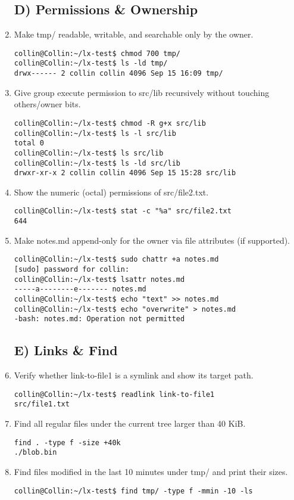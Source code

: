 \begin{enumerate}
\subsection*{D) Permissions \& Ownership}
    \item Make tmp/ readable, writable, and searchable only by the owner.
\begin{verbatim}
collin@Collin:~/lx-test$ chmod 700 tmp/
collin@Collin:~/lx-test$ ls -ld tmp/
drwx------ 2 collin collin 4096 Sep 15 16:09 tmp/
\end{verbatim}
    \item Give group execute permission to src/lib recursively without touching others/owner bits.
\begin{verbatim}
collin@Collin:~/lx-test$ chmod -R g+x src/lib
collin@Collin:~/lx-test$ ls -l src/lib
total 0
collin@Collin:~/lx-test$ ls src/lib
collin@Collin:~/lx-test$ ls -ld src/lib
drwxr-xr-x 2 collin collin 4096 Sep 15 15:28 src/lib
\end{verbatim}
    \item Show the numeric (octal) permissions of src/file2.txt.
\begin{verbatim}
collin@Collin:~/lx-test$ stat -c "%a" src/file2.txt
644   
\end{verbatim}
    \item Make notes.md append-only for the owner via file attributes (if supported).
\begin{verbatim}
collin@Collin:~/lx-test$ sudo chattr +a notes.md
[sudo] password for collin:
collin@Collin:~/lx-test$ lsattr notes.md
-----a--------e------- notes.md
collin@Collin:~/lx-test$ echo "text" >> notes.md
collin@Collin:~/lx-test$ echo "overwrite" > notes.md
-bash: notes.md: Operation not permitted
\end{verbatim}

\subsection*{E) Links \& Find}
    \item Verify whether link-to-file1 is a symlink and show its target path.
\begin{verbatim}
collin@Collin:~/lx-test$ readlink link-to-file1
src/file1.txt
\end{verbatim}
    \item Find all regular files under the current tree larger than 40 KiB.
\begin{verbatim}
find . -type f -size +40k
./blob.bin  
\end{verbatim}
    \item Find files modified in the last 10 minutes under tmp/ and print their sizes.
\begin{verbatim}
collin@Collin:~/lx-test$ find tmp/ -type f -mmin -10 -ls
\end{verbatim}


\end{enumerate}
